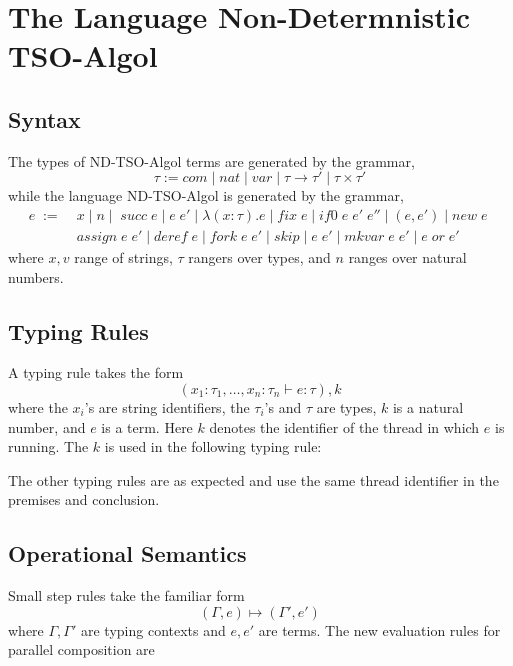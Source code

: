 \documentclass{article}
\begin{document}
\section{The Language Non-Determnistic TSO-Algol}
\subsection{Syntax}
The types of ND-TSO-Algol terms are generated by the grammar,
$$\tau := com \; | \; nat \; | \; var \; | \; \tau \rightarrow \tau' \; | \;
\tau \times \tau'$$ 
while the language ND-TSO-Algol is generated by the grammar,
\begin{align*}
e \; := \; &x \; | \; n \; | \; \; succ \; e \; | \; e \; e' \; | \;
\lambda (x:\tau).e \; | \; fix \; e \; | \; if0 \; e \; e' \; e'' \; | \; (e,
e') \; | \; new \; e \; \\
&assign \; e \; e' \; | \; deref \; e \; |
\; fork \; e \; e' \; | \; skip \; | \; e \; e' \; | \; mkvar \; e \; e' \; | \;
e \; or \; e'
\end{align*}
where $x,v$ range of strings, $\tau$ rangers over types, and $n$ ranges over
natural numbers.
\subsection{Typing Rules}
A typing rule takes the form 
$$(x_1 : \tau_1, \ldots, x_n:\tau_n \vdash e : \tau), k$$
where the $x_i$'s are string identifiers, the $\tau_i$'s and $\tau$ are types,
$k$ is a natural number, and $e$ is a term. Here $k$ denotes the identifier of
the thread in which $e$ is running. The $k$ is used in the following typing
rule:
\begin{prooftree}
\end{prooftree}
The other typing rules are as expected and use the same thread identifier in the
premises and conclusion.
\subsection{Operational Semantics}
Small step rules take the familiar form
$$(\Gamma, e) \mapsto (\Gamma', e')$$
where $\Gamma, \Gamma'$ are typing contexts and $e, e'$ are terms. The new
evaluation rules for parallel composition are
\begin{prooftree}
\end{prooftree}
\begin{prooftree}
\end{prooftree}
\begin{prooftree}
\end{prooftree}
\end{document}
